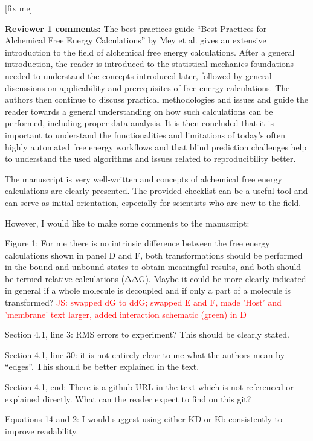\documentclass[10pt,stdletter]{newlfm}
\begin{document}
\begin{newlfm}


[fix me]


\textbf{Reviewer 1 comments:}
The best practices guide “Best Practices for Alchemical Free Energy Calculations” by Mey et al. gives an extensive introduction to the field of alchemical free energy calculations. After a general introduction, the reader is introduced to the statistical mechanics foundations needed to understand the concepts introduced later, followed by general discussions on applicability and prerequisites of free energy calculations. The authors then continue to discuss practical methodologies and issues and guide the reader towards a general understanding on how such calculations can be performed, including proper data analysis. It is then concluded that it is important to understand the functionalities and limitations of today’s often highly automated free energy workflows and that blind prediction challenges help to understand the used algorithms and issues related to reproducibility better.

The manuscript is very well-written and concepts of alchemical free energy calculations are clearly presented. The provided checklist can be a useful tool and can serve as initial orientation, especially for scientists who are new to the field.

However, I would like to make some comments to the manuscript:

Figure 1: For me there is no intrinsic difference between the free energy calculations shown in panel D and F, both transformations should be performed in the bound and unbound states to obtain meaningful results, and both should be termed relative calculations (ΔΔG). Maybe it could be more clearly indicated in general if a whole molecule is decoupled and if only a part of a molecule is transformed?
\textcolor{red}{JS: swapped dG to ddG; swapped E and F, made 'Host' and 'membrane' text larger, added interaction schematic (green) in D}

Section 4.1, line 3: RMS errors to experiment? This should be clearly stated.

Section 4.1, line 30: it is not entirely clear to me what the authors mean by “edges”. This should be better explained in the text.

Section 4.1, end: There is a github URL in the text which is not referenced or explained directly. What can the reader expect to find on this git?

Equations 14 and 2: I would suggest using either KD or Kb consistently to improve readability.


\end{newlfm}
\end{document}
